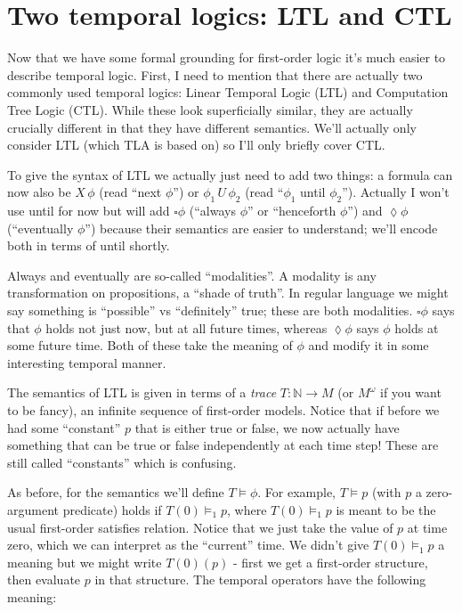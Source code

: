 \documentclass{scrbook}
\begin{document}
\section{Two temporal logics: LTL and CTL}

Now that we have some formal grounding for first-order logic it's much easier to
describe temporal logic. First, I need to mention that there are actually two
commonly used temporal logics: Linear Temporal Logic (LTL) and Computation Tree
Logic (CTL). While these look superficially similar, they are actually crucially
different in that they have different semantics. We'll actually only consider
LTL (which TLA is based on) so I'll only briefly cover CTL.

\newcommand{\next}{X\,}
\newcommand{\until}{\,U\,}
\newcommand{\always}{\square}
\newcommand{\eventually}{\lozenge}

To give the syntax of LTL we actually just need to add two things: a formula can
now also be $\next \phi$ (read ``next $\phi$'') or $\phi_1 \until \phi_{2}$
(read ``$\phi_1$ until $\phi_2$''). Actually I won't use until for now but will
add $\always \phi$ (``always $\phi$'' or ``henceforth $\phi$'') and
$\eventually \phi$ (``eventually $\phi$'') because their semantics are easier to
understand; we'll encode both in terms of until shortly.

Always and eventually are so-called ``modalities''. A modality is any
transformation on propositions, a ``shade of truth''. In regular language we
might say something is ``possible'' vs ``definitely'' true; these are both
modalities.  $\always \phi$  says that $\phi$ holds not just now, but at all
future times, whereas $\eventually \phi$ says $\phi$ holds at some future time.
Both of these take the meaning of $\phi$ and modify it in some interesting
temporal manner.

The semantics of LTL is given in terms of a \emph{trace} $T : \mathbb{N} \to M$
(or $M^{\omega}$ if you want to be fancy), an infinite sequence of first-order
models. Notice that if before we had some ``constant'' $p$ that is either
true or false, we now actually have something that can be true or false
independently at each time step! These are still called ``constants'' which is
confusing.

As before, for the semantics we'll define $T \models \phi$. For example,
$T \models p$ (with $p$ a zero-argument predicate) holds if $T(0) \models_1 p$,
where $T(0) \models_{1} p$ is meant to be the usual first-order satisfies
relation. Notice that we just take the value of $p$ at time zero, which we can
interpret as the ``current'' time. We didn't give $T(0) \models_{1} p$ a meaning
but we might write $T(0)(p)$ - first we get a first-order structure, then
evaluate $p$ in that structure. The temporal operators have the following
meaning:
\end{document}
